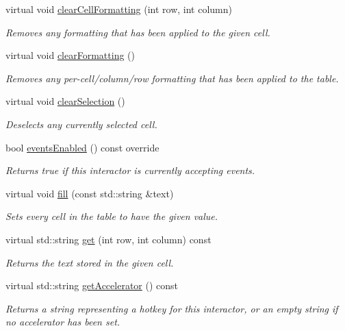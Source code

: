 \begin{DoxyCompactItemize}
virtual void \mbox{\hyperlink{classGTable_a5ba4fe558e9d315c123ecd9e896065ca}{clear\+Cell\+Formatting}} (int row, int column)
\begin{DoxyCompactList}\small\item\em Removes any formatting that has been applied to the given cell. \end{DoxyCompactList}\item 
virtual void \mbox{\hyperlink{classGTable_a07ea41be0cdc43ffcd09898d3ae5c523}{clear\+Formatting}} ()
\begin{DoxyCompactList}\small\item\em Removes any per-\/cell/column/row formatting that has been applied to the table. \end{DoxyCompactList}\item 
virtual void \mbox{\hyperlink{classGTable_abd07e172ccec6823a88289c21124a367}{clear\+Selection}} ()
\begin{DoxyCompactList}\small\item\em Deselects any currently selected cell. \end{DoxyCompactList}\item 
bool \mbox{\hyperlink{classGInteractor_a597a370b592e3737d38d9d2f4e2031ea}{events\+Enabled}} () const override
\begin{DoxyCompactList}\small\item\em Returns true if this interactor is currently accepting events. \end{DoxyCompactList}\item 
virtual void \mbox{\hyperlink{classGTable_a1ff40d0915f96652929cfb739bdd969f}{fill}} (const std\+::string \&text)
\begin{DoxyCompactList}\small\item\em Sets every cell in the table to have the given value. \end{DoxyCompactList}\item 
virtual std\+::string \mbox{\hyperlink{classGTable_aaa9971dcb7e1b082abd3b9010667f041}{get}} (int row, int column) const
\begin{DoxyCompactList}\small\item\em Returns the text stored in the given cell. \end{DoxyCompactList}\item 
virtual std\+::string \mbox{\hyperlink{classGInteractor_a69f8d23ed8f207fbecad99960776e942}{get\+Accelerator}} () const
\begin{DoxyCompactList}\small\item\em Returns a string representing a hotkey for this interactor, or an empty string if no accelerator has been set. \end{DoxyCompactList}\item 

\end{DoxyCompactItemize}
